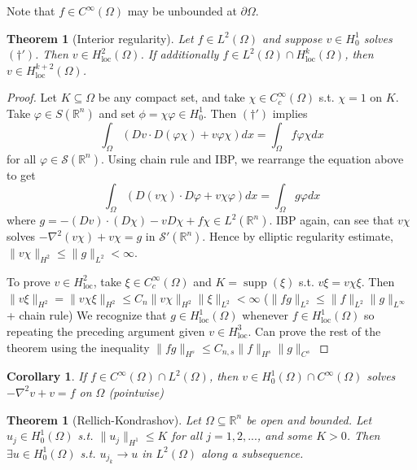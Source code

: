 \documentclass{article}
\theoremstyle{definition}
\theoremstyle{remark}
\theoremstyle{plain}
\newtheorem{thm}[defn]{Theorem}
\newtheorem{crly}[defn]{Corollary}
\newcommand{\RR}{\mathbb{R}}
\begin{document}
 Note that $f\in C^\infty(\Omega)$ may be unbounded at $\partial\Omega$.
 \begin{thm}[Interior regularity]
     Let $f\in L^2(\Omega)$ and suppose $v\in H_0^1$ solves $(\dagger')$. Then $v\in H^2_{\text{loc}}(\Omega)$. If additionally $f\in L^2(\Omega)\cap H^k_{\text{loc}}(\Omega)$, then $v\in H^{k+2}_{\text{loc}}(\Omega)$.
 \end{thm}
 \begin{proof}
 Let $K\subseteq\Omega$ be any compact set, and take $\chi\in C_c^\infty(\Omega)$ s.t. $\chi=1$ on $K$. Take $\varphi\in S(\RR^n)$ and set $\phi=\chi\varphi\in H_0^1$. Then $(\dagger')$ implies
 \[\int_\Omega(Dv\cdot D(\varphi\chi)+v\varphi\chi)dx=\int_\Omega f\varphi\chi dx\] for all $\varphi\in\mathcal S(\RR^n)$.
 Using chain rule and IBP, we rearrange the equation above to get
 \[\int_{\Omega}(D(v\chi)\cdot D\varphi+v\chi\varphi)dx=\int_\Omega g\varphi dx\]
 where $g=-(Dv)\cdot(D\chi)-v D\chi+f\chi\in L^2(\RR^n)$. IBP again, can see that $v\chi$ solves $-\nabla^2(v\chi)+v\chi=g$ in $\mathcal S'(\RR^n)$. Hence by elliptic regularity estimate, $\|v\chi\|_{H^2}\le \|g\|_{L^2}<\infty$.

 To prove $v\in H^2_{\text{loc}}$, take $\xi\in C^\infty_c(\Omega)$ and $K=\operatorname{supp}(\xi)$ s.t. $v\xi=v\chi\xi$. Then $\|v\xi\|_{H^2}=\|v\chi\xi\|_{H^2}\le C_n\|v\chi\|_{H^2}\|\xi\|_{L^2}<\infty$ ($\|fg\|_{L^2}\le \|f\|_{L^2}\|g\|_{L^\infty}$ + chain rule) We recognize that $g\in H^1_{\text{loc}}(\Omega)$ whenever $f\in H^1_{\text{loc}}(\Omega)$ so repeating the preceding argument given $v\in H^3_{\text{loc}}$. Can prove the rest of the theorem using the inequality $\|fg\|_{H^s}\le C_{n,s}\|f\|_{H^s}\|g\|_{C^s}$
 \end{proof}
 \begin{crly}
     If $f\in C^\infty(\Omega)\cap L^2(\Omega)$, then $v\in H_0^1(\Omega)\cap C^\infty(\Omega)$ solves $-\nabla^2 v+v=f$ on $\Omega$ (pointwise)
 \end{crly}
\begin{thm}[Rellich-Kondrashov]
    Let $\Omega\subseteq\RR^n$ be open and bounded. Let $u_j\in H_0^1(\Omega)$ s.t. $\|u_j\|_{H^1}\le K$ for all $j=1,2,...$, and some $K>0$. Then $\exists u\in H_0^1(\Omega)$ s.t. $u_{j_k}\to u$ in $L^2(\Omega)$ along a subsequence.
\end{thm}
\end{document}
